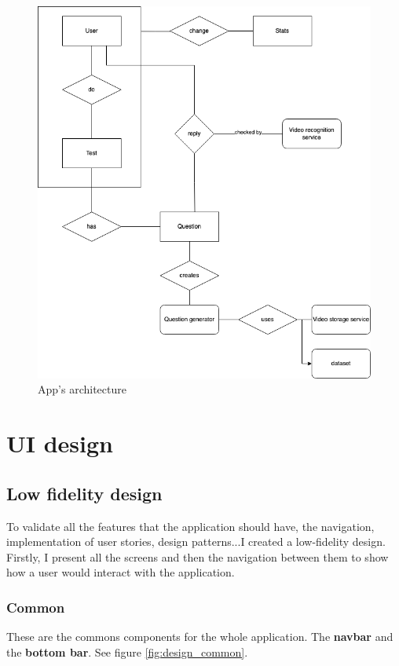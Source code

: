 \begin{figure}[H]
    \centering
        \includegraphics[width=\textwidth]{assets/diagrams/conceptual.png}
    \caption{App's architecture}
    \label{fig:design_conceptual}
\end{figure}

\section{UI design}
\subsection{Low fidelity design}
To validate all the features that the application should have, the navigation, implementation of user stories, design patterns...I created a low-fidelity design. \\

Firstly, I present all the screens and then the navigation between them to show how a user would interact with the application.

\subsubsection{Common}
These are the commons components for the whole application. The \textbf{navbar} and the \textbf{bottom bar}. See figure \ref{fig:design_common}.

